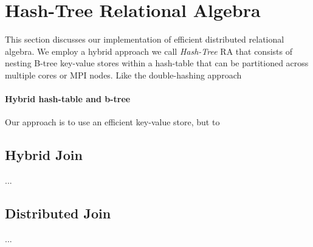 

\section{Hash-Tree Relational Algebra}
\label{sec:impl}
%
This section discusses our implementation of efficient distributed relational algebra. We employ a hybrid approach we call \emph{Hash-Tree} RA that consists of nesting B-tree key-value stores within a hash-table that can be partitioned across multiple cores or MPI nodes. Like the double-hashing approach 



\paragraph{Hybrid hash-table and b-tree} Our approach is to use an efficient key-value store, but to



\subsection{Hybrid Join}

...

\subsection{Distributed Join}

...
